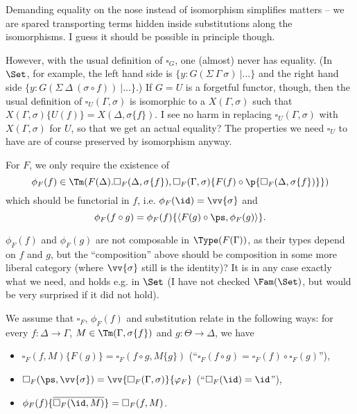 \documentclass{article}
\newcommand{\isoFL}{\ensuremath{\phi_{F}}} %
\begin{document}
\begin{remark}
  Demanding equality on the nose instead of isomorphism simplifies
  matters -- we are spared transporting terms hidden inside
  substitutions along the isomorphisms. I guess it should be possible
  in principle though.

  However, with the usual definition of $\square_G$, one (almost)
  never has equality. (In $\Set$, for example, the left hand side is
  $\{ y : G(\Sigma\ \Gamma\ \sigma)\ |\ldots\}$ and the right hand
  side $\{ y : G(\Sigma\ \Delta\ (\sigma \circ f))\ |\ldots\}$.)  If
  $G = U$ is a forgetful functor, though, then the usual definition of
  $\square_U(\Gamma, \sigma)$ is isomorphic to a $X(\Gamma, \sigma)$
  such that $X(\Gamma, \sigma)\{U(f)\} = X(\Delta, \sigma\{f\})$. I
  see no harm in replacing $\square_U(\Gamma, \sigma)$ with $X(\Gamma,
  \sigma)$ for $U$, so that we get an actual equality? The properties
  we need $\square_U$ to have are of course preserved by isomorphism
  anyway.
\end{remark}
%
For $F$, we only require the existence of
\[
\isoFL(f) \in \Tm(F(\Delta).\square_F(\Delta, \sigma\{f\}),
\square_F(\Gamma, \sigma)\{F(f) \circ \p{\square_F(\Delta,
  \sigma\{f\})}\})
\]
which should be functorial in $f$, i.e. $\isoFL(\id) = \vv{\sigma}$
and 
\[
\isoFL(f \circ g) = \isoFL(f)\{\langle F(g) \circ \ps, \isoFL(g)\rangle\}.
\]

\begin{remark}
  $\isoFL(f)$ and $\isoFL(g)$ are not composable in
  $\Type(F(\Gamma))$, as their types depend on $f$ and $g$, but the
  ``composition'' above should be composition in some more liberal
  category (where $\vv{\sigma}$ still is the identity)? It is in any
  case exactly what we need, and holds e.g. in $\Set$ (I
  have not checked $\Fam(\Set)$, but would be very surprised if it did
  not hold).
\end{remark}

We assume that $\square_F$, $\isoFL(f)$ and substitution relate in the
following ways: for every $f : \Delta \to \Gamma$, $M \in \Tm(\Gamma,
\sigma\{f\})$ and $g : \Theta \to \Delta$, we have
\begin{itemize}
\item $\square_F(f, M)\{F(g)\} = \square_F(f \circ g, M\{g\})$  \quad(``$\square_F(f \circ g) = \square_F(f) \circ \square_F(g)$''),
\item $\square_F(\ps, \vv{\sigma}) = \vv{\square_F(\Gamma, \sigma)}\{\varphi_F\}$ \quad\qquad\qquad(``$\square_F(\id) = \id$''),
\item $\isoFL(f)\{\overline{\square_F(\id, M)}\} = \square_F(f, M)$.
\end{itemize}
\end{document}
